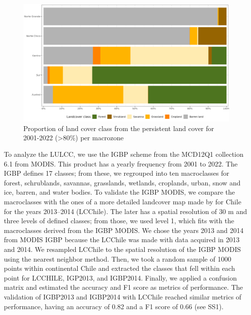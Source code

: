 \documentclass[
  authoryear,
  preprint,
  3p,
  onecolumn]{elsarticle}
\begin{document}
\begin{figure}[!ht]

{\centering \includegraphics{../output/figs/LC_pers80_per_macrozone.png}

}

\caption{\label{fig-LCprop}Proportion of land cover class from the
persistent land cover for 2001-2022 (\textgreater80\%) per macrozone}

\end{figure}

To analyze the LULCC, we use the IGBP scheme from the MCD12Q1 collection
6.1 from MODIS. This product has a yearly frequency from 2001 to 2022.
The IGBP defines 17 classes; from these, we regrouped into ten
macroclasses for forest, schrublands, savannas, grasslands, wetlands,
croplands, urban, snow and ice, barren, and water bodies. To validate
the IGBP MODIS, we compare the macroclasses with the ones of a more
detailed landcover map made by \citet{Zhao2016} for Chile for the years
2013--2014 (LCChile). The later has a spatial resolution of 30 m and
three levels of defined classes; from those, we used level 1, which fits
with the macroclasses derived from the IGBP MODIS. We chose the years
2013 and 2014 from MODIS IGBP because the LCChile was made with data
acquired in 2013 and 2014. We resampled LCChile to the spatial
resolution of the IGBP MODIS using the nearest neighbor method. Then, we
took a random sample of 1000 points within continental Chile and
extracted the classes that fell within each point for LCCHILE, IGP2013,
and IGBP2014. Finally, we applied a confusion matrix and estimated the
accuracy and F1 score as metrics of performance. The validation of
IGBP2013 and IGBP2014 with LCChile reached similar metrics of
performance, having an accuracy of 0.82 and a F1 score of 0.66 (see
SS1).
\end{document}
